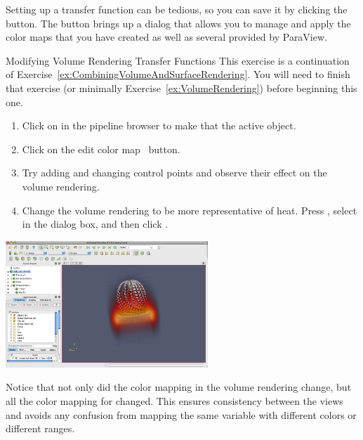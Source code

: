 Setting up a transfer function can be tedious, so you can save it by
clicking the  button.  The
 button brings up a
dialog that allows you to manage and apply the color maps that you have
created as well as several provided by ParaView.

\begin{exercise}{Modifying Volume Rendering Transfer Functions}
  \label{ex:ModifyingVolumeRenderingTransferFunctions}%
  This exercise is a continuation of
  Exercise~\ref{ex:CombiningVolumeAndSurfaceRendering}.  You will need to
  finish that exercise (or minimally Exercise~\ref{ex:VolumeRendering})
  before beginning this one.

  \begin{enumerate}
  \item Click on  in the pipeline browser to make
    that the active object.
  \item Click on the edit color map~ button.
  \item Try adding and changing control points and observe their effect on
    the volume rendering.
  \item Change the volume rendering to be more representative of heat.
    Press , select
     in the dialog box, and then click .
  \end{enumerate}

  \begin{inlinefig}
    \includegraphics[width=3in]{images/VolumeRender3}
  \end{inlinefig}

  Notice that not only did the color mapping in the volume rendering
  change, but all the color mapping for  changed.  This ensures
  consistency between the views and avoids any confusion from mapping the
  same variable with different colors or different ranges.
\end{exercise}


